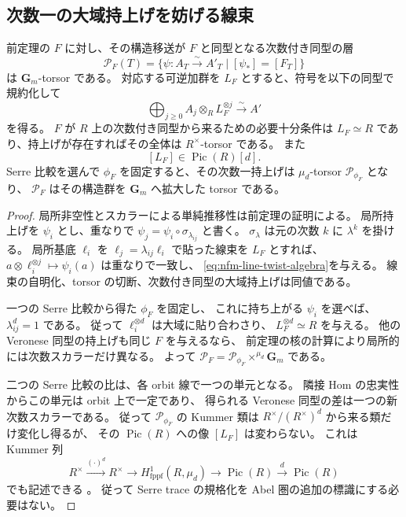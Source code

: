 \subsection{次数一の大域持上げを妨げる線束}

\begin{proposition}
\label{prop:nfm-lifting-line}
前定理の $F$ に対し、その構造移送が $F$ と同型となる次数付き同型の層
\[
 \mathcal P_F(T)=
 \{\psi:A_T\xrightarrow{\sim}A'_T\mid [\psi_*]=[F_T]\}
\]
は $\mathbf G_m$-torsor である。
対応する可逆加群を $L_F$ とすると、符号を以下の同型で規約化して
\begin{equation}
\label{eq:nfm-line-twist-algebra}
 \bigoplus_{j\ge0} A_j\otimes_R L_F^{\otimes j}
 \xrightarrow{\sim} A'
\end{equation}
を得る。
$F$ が $R$ 上の次数付き同型から来るための必要十分条件は
$L_F\simeq R$ であり、持上げが存在すればその全体は $R^\times$-torsor である。
また
\[
 [L_F]\in\operatorname{Pic}(R)[d].
\]
Serre 比較を選んで $\phi_F$ を固定すると、その次数一持上げは
$\mu_d$-torsor $\mathcal P_{\phi_F}$ となり、
$\mathcal P_F$ はその構造群を $\mathbf G_m$ へ拡大した torsor である。
\end{proposition}

\begin{proof}
局所非空性とスカラーによる単純推移性は前定理の証明による。
局所持上げを $\psi_i$ とし、重なりで
$\psi_j=\psi_i\circ\sigma_{\lambda_{ij}}$ と書く。
$\sigma_\lambda$ は元の次数 $k$ に $\lambda^k$ を掛ける。
局所基底 $\ell_i$ を $\ell_j=\lambda_{ij}\ell_i$ で貼った線束を $L_F$ とすれば、
$a\otimes\ell_i^{\otimes j}\mapsto\psi_i(a)$ は重なりで一致し、
\eqref{eq:nfm-line-twist-algebra}を与える。
線束の自明化、torsor の切断、次数付き同型の大域持上げは同値である。

一つの Serre 比較から得た $\phi_F$ を固定し、
これに持ち上がる $\psi_i$ を選べば、$\lambda_{ij}^d=1$ である。
従って $\ell_i^{\otimes d}$ は大域に貼り合わさり、
$L_F^{\otimes d}\simeq R$ を与える。
他の Veronese 同型の持上げも同じ $F$ を与えるなら、
前定理の核の計算により局所的には次数スカラーだけ異なる。
よって $\mathcal P_F=\mathcal P_{\phi_F}\times^{\mu_d}\mathbf G_m$ である。

二つの Serre 比較の比は、各 orbit 線で一つの単元となる。
隣接 Hom の忠実性からこの単元は orbit 上で一定であり、
得られる Veronese 同型の差は一つの新次数スカラーである。
従って $\mathcal P_{\phi_F}$ の Kummer 類は
$R^\times/(R^\times)^d$ から来る類だけ変化し得るが、
その $\operatorname{Pic}(R)$ への像 $[L_F]$ は変わらない。
これは Kummer 列
\[
 R^\times\xrightarrow{(\cdot)^d}R^\times
 \longrightarrow H^1_{\mathrm{fppf}}(R,\mu_d)
 \longrightarrow\operatorname{Pic}(R)
 \xrightarrow{d}\operatorname{Pic}(R)
\]
でも記述できる
\cite[Section~59.28, Tags~03PK, 040Q]{NFMStacksKummer}。
従って Serre trace の規格化を Abel 圏の追加の標識にする必要はない。
\end{proof}

